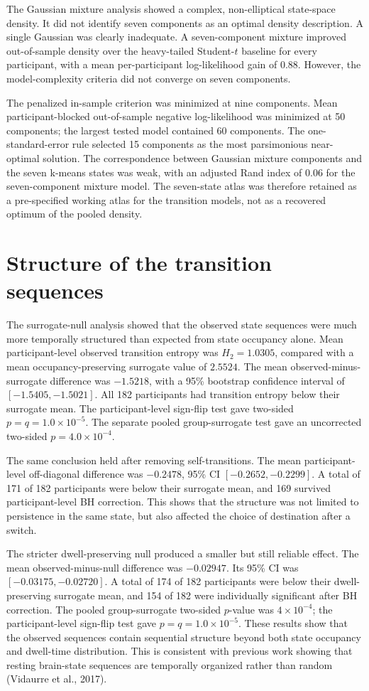 \documentclass[12pt,a4paper]{report}
\begin{document}
The Gaussian mixture analysis showed a complex, non-elliptical state-space density. It did not identify seven components as an optimal density description. A single Gaussian was clearly inadequate. A seven-component mixture improved out-of-sample density over the heavy-tailed Student-$t$ baseline for every participant, with a mean per-participant log-likelihood gain of 0.88. However, the model-complexity criteria did not converge on seven components.

The penalized in-sample criterion was minimized at nine components. Mean participant-blocked out-of-sample negative log-likelihood was minimized at 50 components; the largest tested model contained 60 components. The one-standard-error rule selected 15 components as the most parsimonious near-optimal solution. The correspondence between Gaussian mixture components and the seven k-means states was weak, with an adjusted Rand index of 0.06 for the seven-component mixture model. The seven-state atlas was therefore retained as a pre-specified working atlas for the transition models, not as a recovered optimum of the pooled density.

\section{Structure of the transition sequences}

The surrogate-null analysis showed that the observed state sequences were much more temporally structured than expected from state occupancy alone. Mean participant-level observed transition entropy was $H_2=1.0305$, compared with a mean occupancy-preserving surrogate value of $2.5524$. The mean observed-minus-surrogate difference was $-1.5218$, with a 95\% bootstrap confidence interval of $[-1.5405,-1.5021]$. All 182 participants had transition entropy below their surrogate mean. The participant-level sign-flip test gave two-sided $p=q=1.0 \times 10^{-5}$. The separate pooled group-surrogate test gave an uncorrected two-sided $p=4.0 \times 10^{-4}$.

The same conclusion held after removing self-transitions. The mean participant-level off-diagonal difference was $-0.2478$, 95\% CI $[-0.2652,-0.2299]$. A total of 171 of 182 participants were below their surrogate mean, and 169 survived participant-level BH correction. This shows that the structure was not limited to persistence in the same state, but also affected the choice of destination after a switch.

The stricter dwell-preserving null produced a smaller but still reliable effect. The mean observed-minus-null difference was $-0.02947$. Its 95\% CI was $[-0.03175,-0.02720]$. A total of 174 of 182 participants were below their dwell-preserving surrogate mean, and 154 of 182 were individually significant after BH correction. The pooled group-surrogate two-sided $p$-value was $4 \times 10^{-4}$; the participant-level sign-flip test gave $p=q=1.0 \times 10^{-5}$. These results show that the observed sequences contain sequential structure beyond both state occupancy and dwell-time distribution. This is consistent with previous work showing that resting brain-state sequences are temporally organized rather than random (Vidaurre et al., 2017).
\end{document}
